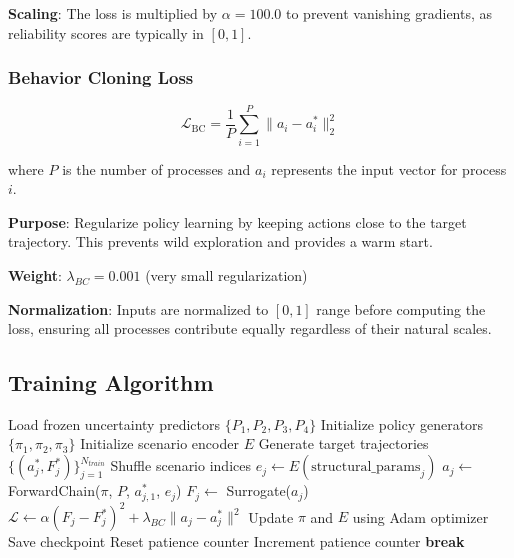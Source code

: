 \documentclass[11pt,a4paper]{article}
\begin{document}
\textbf{Scaling}: The loss is multiplied by $\alpha = 100.0$ to prevent vanishing gradients, as reliability scores are typically in $[0,1]$.

\subsubsection{Behavior Cloning Loss}

$$
\mathcal{L}_{\text{BC}} = \frac{1}{P} \sum_{i=1}^{P} \| a_i - a_i^* \|_2^2
$$

where $P$ is the number of processes and $a_i$ represents the input vector for process $i$.

\textbf{Purpose}: Regularize policy learning by keeping actions close to the target trajectory. This prevents wild exploration and provides a warm start.

\textbf{Weight}: $\lambda_{BC} = 0.001$ (very small regularization)

\textbf{Normalization}: Inputs are normalized to $[0,1]$ range before computing the loss, ensuring all processes contribute equally regardless of their natural scales.

\subsection{Training Algorithm}

\begin{algorithm}
\caption{Controller Training Loop}
\begin{algorithmic}[1]
\State Load frozen uncertainty predictors $\{P_1, P_2, P_3, P_4\}$
\State Initialize policy generators $\{\pi_1, \pi_2, \pi_3\}$
\State Initialize scenario encoder $E$
\State Generate target trajectories $\{(a^*_j, F^*_j)\}_{j=1}^{N_{train}}$
    \State Shuffle scenario indices
        \State $e_j \gets E(\text{structural\_params}_j)$ 
        \State $a_j \gets$ ForwardChain($\pi$, $P$, $a^*_{j,1}$, $e_j$) 
        \State $F_j \gets$ Surrogate($a_j$) 
        \State $\mathcal{L} \gets \alpha (F_j - F^*_j)^2 + \lambda_{BC} \| a_j - a^*_j \|^2$
        \State Update $\pi$ and $E$ using Adam optimizer
    \EndFor
        \State Save checkpoint
        \State Reset patience counter
    \Else
        \State Increment patience counter
    \EndIf
        \State \textbf{break} 
    \EndIf
\EndFor
\end{algorithmic}
\end{algorithm}
\end{document}
